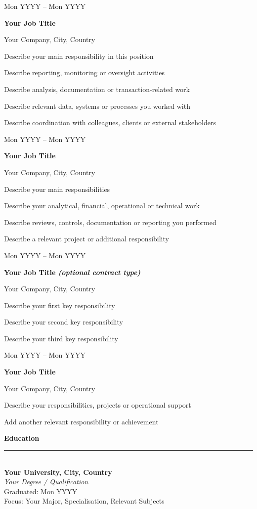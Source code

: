 \documentclass[11pt,a4paper]{article}
\newcommand{\cvsection}[1]{%
  \vspace{0pt}%
  {\large\bfseries\color{SoftBlue} #1}\\[-2ex]%
  {\color{SoftBlue}\rule{\linewidth}{0.4pt}}\\[0.2ex]%
}
\newcommand{\entry}[4]{%
  \noindent
  {\small\color{SoftBlue}#1}\par
  \textbf{#2}\par
  {#3}\par

  \vspace{-2pt}
  \begin{list}{\textcolor{black!80}{\large\textbullet}}{%
    \setlength{\leftmargin}{1.5em}
    \setlength{\labelsep}{0.6em}
    \setlength{\itemsep}{0.5pt}
    \setlength{\parsep}{0pt}
  }
    #4
  \end{list}
  \vspace{6pt}
}
\begin{document}
\entry
{Mon YYYY -- Mon YYYY}
{Your Job Title}
{Your Company, City, Country}
{\vspace{-5pt}
\item Describe your main responsibility in this position
\item Describe reporting, monitoring or oversight activities
\item Describe analysis, documentation or transaction-related work
\item Describe relevant data, systems or processes you worked with
\item Describe coordination with colleagues, clients or external stakeholders
}
\vspace{-10pt}

\entry
{Mon YYYY -- Mon YYYY}
{Your Job Title}
{Your Company, City, Country}
{\vspace{-5pt}
\item Describe your main responsibilities
\item Describe your analytical, financial, operational or technical work
\item Describe reviews, controls, documentation or reporting you performed
\item Describe a relevant project or additional responsibility
}
\vspace{-10pt}

\entry
{Mon YYYY -- Mon YYYY}
{Your Job Title {\footnotesize\textit{(optional contract type)}}}
{Your Company, City, Country}
{\vspace{-5pt}
\item Describe your first key responsibility
\item Describe your second key responsibility
\item Describe your third key responsibility
}
\vspace{-10pt}

\entry
{Mon YYYY -- Mon YYYY}
{Your Job Title}
{Your Company, City, Country}
{\vspace{-5pt}
\item Describe your responsibilities, projects or operational support
\item Add another relevant responsibility or achievement
}
\vspace{-5pt}

\cvsection{Education}
\textbf{Your University, City, Country}\\
\textit{Your Degree / Qualification}\\
Graduated: Mon YYYY\\
Focus: Your Major, Specialisation, Relevant Subjects\\\vspace{-5pt}
\end{document}

